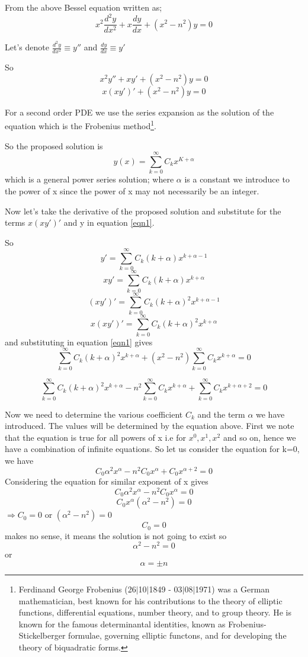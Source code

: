 From the above Bessel equation written as;
$$x^2 \frac{d^2 y}{dx^2} + x \frac{dy}{dx} + (x^2 - n^2)y = 0$$ \hspace{0.8cm}

Let's denote $\frac{d^2 y}{dx^2} \equiv y''$ and $\frac{dy}{dx} \equiv y'$

So 
$$x^2y'' + xy' + (x^2 - n^2)y = 0$$
\begin{equation}
x(xy')' + (x^2 - n^2)y = 0
\label{eqn1}
\end{equation} 
  
For a second order PDE we use the series expansion as the solution of the equation which is the Frobenius method\footnote{Ferdinand George Frobenius  (26$|$10$|$1849 - 03$|$08$|$1971) was a German mathematician, best known for his contributions to the theory of elliptic functions, differential equations, number theory, and to group theory. He is known for the famous determinantal identities, known as Frobenius- Stickelberger formulae, governing elliptic functons, and for developing the theory of biquadratic forms.}.

So the proposed solution is 
$$y(x) = \sum_{k=0}^{\infty}C_k x^{K + \alpha} $$
which is a general power series solution; where $\alpha$ is a constant we introduce to the power of x since the power of x may not necessarily be an integer.

Now let's take the derivative of the proposed solution and substitute for the terms $x(xy')'$ and y in equation \ref{eqn1}.

So
$$y' = \sum_{k=0}^{\infty}C_k (k + \alpha) x^{k + \alpha - 1}$$
$$xy' = \sum_{k=0}^{\infty}C_k (k + \alpha) x^{k + \alpha}$$
$$(xy')' = \sum_{k=0}^{\infty}C_k (k + \alpha)^2 x^{k + \alpha - 1}$$
$$x(xy')' = \sum_{k=0}^{\infty}C_k (k + \alpha)^2 x^{k + \alpha}$$
and substituting in equation \ref{eqn1} gives
$$\sum_{k=0}^{\infty}C_k (k + \alpha)^2 x^{k + \alpha} + (x^2 - n^2)\sum_{k=0}^{\infty}C_k x^{k + \alpha} = 0 $$
  
$$\sum_{k=0}^{\infty}C_k (k + \alpha)^2 x^{k + \alpha} - n^2\sum_{k=0}^{\infty}C_k x^{k + \alpha} + \sum_{k=0}^{\infty}C_k x^{k + \alpha + 2} = 0 $$ 

Now we need to determine the various coefficient $C_k$ and the term $\alpha$ we have introduced. The values will be determined by the equation above. First we note that the equation is true for all powers of x i.e for $x^0, x^1 , x^2$ and so on, hence we have a combination of infinite equations. So let us consider the equation for k=0, we have 
$$ C_0 \alpha^2 x^\alpha - n^2C_0 x^\alpha + C_0 x^{\alpha + 2} =0$$ 
Considering the equation for similar exponent of x gives 
$$ C_0 \alpha^2 x^\alpha - n^2C_0 x^\alpha =0$$
$$ C_0 x^\alpha(\alpha^2 -n^2) =0$$
$\Rightarrow C_0 =0$ or $(\alpha^2 -n^2) =0$ 
$$C_0 =0$$ makes no sense, it means the solution is not going to exist so  $$\alpha^2 -n^2 =0$$ or  $$\alpha =\pm n$$

